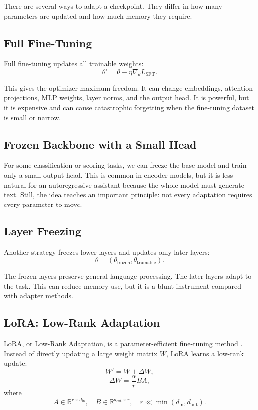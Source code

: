 There are several ways to adapt a checkpoint. They differ in how many parameters are updated and how much memory they require.

\subsection*{Full Fine-Tuning}

Full fine-tuning updates all trainable weights:
\[
\theta' = \theta - \eta \nabla_{\theta}L_{\text{SFT}}.
\]

This gives the optimizer maximum freedom. It can change embeddings, attention projections, MLP weights, layer norms, and the output head. It is powerful, but it is expensive and can cause catastrophic forgetting when the fine-tuning dataset is small or narrow.

\subsection*{Frozen Backbone with a Small Head}

For some classification or scoring tasks, we can freeze the base model and train only a small output head. This is common in encoder models, but it is less natural for an autoregressive assistant because the whole model must generate text. Still, the idea teaches an important principle: not every adaptation requires every parameter to move.

\subsection*{Layer Freezing}

Another strategy freezes lower layers and updates only later layers:
\[
\theta =
(\theta_{\text{frozen}}, \theta_{\text{trainable}}).
\]

The frozen layers preserve general language processing. The later layers adapt to the task. This can reduce memory use, but it is a blunt instrument compared with adapter methods.

\subsection*{LoRA: Low-Rank Adaptation}

LoRA, or Low-Rank Adaptation, is a parameter-efficient fine-tuning method \cite{hu2021lora}. Instead of directly updating a large weight matrix \(W\), LoRA learns a low-rank update:
\[
W' = W + \Delta W,
\]
\[
\Delta W = \frac{\alpha}{r}BA,
\]
where
\[
A \in \mathbb{R}^{r \times d_{\text{in}}},
\quad
B \in \mathbb{R}^{d_{\text{out}} \times r},
\quad
r \ll \min(d_{\text{in}},d_{\text{out}}).
\]

